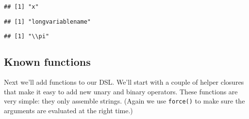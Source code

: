 \begin{verbatim}
## [1] "x"
\end{verbatim}

\begin{Shaded}
\begin{Highlighting}[]
\end{Highlighting}
\end{Shaded}

\begin{verbatim}
## [1] "longvariablename"
\end{verbatim}

\begin{Shaded}
\begin{Highlighting}[]
\end{Highlighting}
\end{Shaded}

\begin{verbatim}
## [1] "\\pi"
\end{verbatim}

\hypertarget{known-functions}{%
\subsection{Known functions}\label{known-functions}}

Next we'll add functions to our DSL. We'll start with a couple of helper
closures that make it easy to add new unary and binary operators. These
functions are very simple: they only assemble strings. (Again we use
\texttt{force()} to make sure the arguments are evaluated at the right
time.)

\begin{Shaded}
\begin{Highlighting}[]
\StringTok{ }
\NormalTok{  \}}
\NormalTok{\}}

\StringTok{ }
\NormalTok{  \}}
\NormalTok{\}}
\end{Highlighting}
\end{Shaded}

